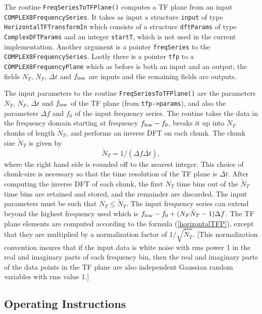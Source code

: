 \documentclass{article}
\begin{document}
The routine \verb+FreqSeriesToTFPlane()+ computes a TF plane from an input 
\verb+COMPLEX8FrequencySeries+.  
It takes as input a structure \verb+input+ of type
\verb+HorizontalTFTransformIn+ which consists of a structure
\verb+dftParams+ of type \verb+ComplexDFTParams+ and an integer \verb+startT+,
which is not used in the current implementation.
Another argument is a pointer
\verb+freqSeries+ to the \verb+COMPLEX8FrequencySeries+.
Lastly there is a pointer \verb+tfp+ to a \verb+COMPLEX8FrequencyPlane+
which as before is both an input and an output; the fields
$N_T$, $N_F$, ${\overline {\Delta t}}$ and $f_{\rm low}$ are inputs and
the remaining fields are outputs.


The input parameters to the routine \verb+FreqSeriesToTFPlane()+ are the
parameters $N_T$, $N_F$, ${\overline {\Delta t}}$ and $f_{\rm low}$ of
the TF plane (from \verb+tfp->params+), and also the parameters
$\Delta f$ and $f_0$ of the input frequency series.  
The routine takes the data in the frequency domain starting at
frequency $f_{\rm low} - f_0$, breaks it up into $N_F$ chunks of
length ${\tilde N}_T$, and performs an inverse DFT on each chunk.
The chunk size ${\tilde N}_T$ is given by
\begin{equation}
{\tilde N}_T =  1 /( \Delta f  {\overline {\Delta t}}),
\end{equation}
where the right hand side is rounded off to the nearest integer.  
This choice of chunk-size is necessary so that the time resolution of
the TF plane is ${\overline {\Delta t}}$.  
After computing the inverse DFT of each chunk, the first $N_T$ time
bins out of the ${\tilde N}_T$ time bins are
retained and stored, and the remainder are discarded.
The input parameters must be such that $N_T \le {\tilde N}_T$.
The input frequency series can extend beyond the highest frequency used
which is $f_{\rm low} - f_0 + (N_F {\tilde N}_T -1){\Delta f}$.
The TF plane elements are computed according to the formula
(\ref{horizontalTFP}), except that they are multiplied by a
normalization factor of $1/\sqrt{{\tilde N}_T}$.  
[This
normalization convention insures that if the input data is white noise
with rms power 1 in the 
real and imaginary parts of each frequency bin, then the real and
imaginary parts of the data points in the TF plane are also
independent Gaussian random variables with rms value 1.]  





\subsection{Operating Instructions}
\end{document}
